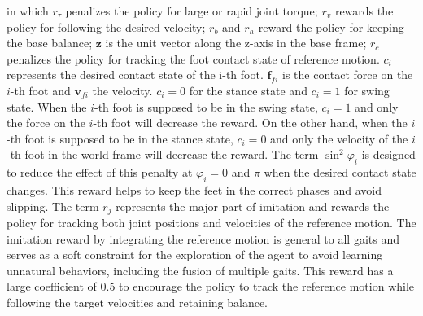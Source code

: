\documentclass[letterpaper, 10 pt, journal, twoside]{IEEEtran} %
\begin{document}
in which $r_\tau$ penalizes the policy for large or rapid joint torque; $r_{v}$ rewards the policy for following the desired velocity; $r_{b}$ and $r_h$ reward the policy for keeping the base balance; $\boldsymbol{z}$ is the unit vector along the z-axis in the base frame; $r_c$ penalizes the policy for tracking the foot contact state of reference motion. $c_i$ represents the desired contact state of the i-th foot. $\boldsymbol{f}_{fi}$ is the contact force on the $i$-th foot and $\boldsymbol{v}_{fi}$ the velocity. $c_i=0$ for the stance state and $c_i=1$ for swing state. When the $i$-th foot is supposed to be in the swing state, $c_i=1$ and only the force on the $i$-th foot will decrease the reward. On the other hand, when the $i$-th foot is supposed to be in the stance state, $c_i=0$ and only the velocity of the $i$-th foot in the world frame will decrease the reward. The term $\sin^2{\varphi_i}$ is designed to reduce the effect of this penalty at $\varphi_i=0$ and $\pi$ when the desired contact state changes. This reward helps to keep the feet in the correct phases and avoid slipping. The term $r_j$ represents the major part of imitation and rewards the policy for tracking both joint positions and velocities of the reference motion. The imitation reward by integrating the reference motion is general to all gaits and serves as a soft constraint for the exploration of the agent to avoid learning unnatural behaviors, including the fusion of multiple gaits. This reward has a large coefficient of $0.5$ to encourage the policy to track the reference motion while following the target velocities and retaining balance.
\end{document}
